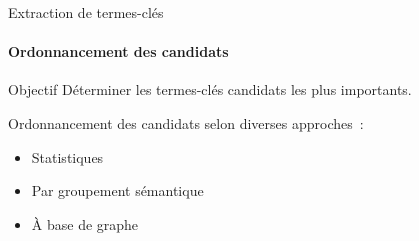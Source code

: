   \begin{frame}{Extraction de termes-clés}\framesubtitle{Ordonnancement des candidats}
    \begin{block}{Objectif}
      Déterminer les termes-clés candidats les plus importants.
    \end{block}

    \vspace{1em}

    Ordonnancement des candidats selon diverses approches~:
    \begin{itemize}
      \item{Statistiques~\cite[TF-IDF]{salton1975tfidf}}
      \item{Par groupement sémantique~\cite[KeyCluster]{liu2009keycluster}}
      \item{À base de graphe~\cite[TextRank]{mihalcea2004textrank}}
    \end{itemize}
  \end{frame}

